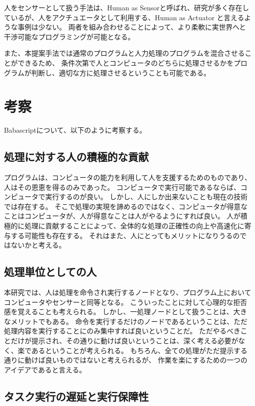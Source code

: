 \documentclass[twoside]{wiss}
\begin{document}
人をセンサーとして扱う手法は、Human as Sensorと呼ばれ、研究が多く存在しているが、人をアクチュエータとして利用する、Human as Actuator と言えるような事例は少ない。
両者を組み合わせることによって、より柔軟に実世界へと干渉可能なプログラミングが可能となる。

また、本提案手法では通常のプログラムと人力処理のプログラムを混合させることができるため、
条件次第で人とコンピュータのどちらに処理させるかをプログラムが判断し、適切な方に処理させるということも可能である。


\section{考察}

Babascriptについて、以下のように考察する。

\subsection{処理に対する人の積極的な貢献}

プログラムは、コンピュータの能力を利用して人を支援するためのものであり、人はその恩恵を得るのみであった。
コンピュータで実行可能であるならば、コンピュータで実行するのが良い。
しかし、人にしか出来ないことも現在の技術では存在する。
そこで処理の実現を諦めるのではなく、コンピュータが得意なことはコンピュータが、人が得意なことは人がやるようにすれば良い。
人が積極的に処理に貢献することによって、全体的な処理の正確性の向上や高速化に寄与する可能性も存在する。
それはまた、人にとってもメリットになりうるのではないかと考える。

\subsection{処理単位としての人}

本研究では、人は処理を命令され実行するノードとなり、プログラム上においてコンピュータやセンサーと同等となる。
こういったことに対して心理的な拒否感を覚えることも考えられる。
しかし、一処理ノードとして扱うことは、大きなメリットでもある。
命令を実行するだけのノードであるということは、ただ処理内容を実行することにのみ集中すれば良いということだ。
ただやるべきことだけが提示され、その通りに動けば良いということは、深く考える必要がなく、楽であるということが考えられる。
もちろん、全ての処理がただ提示する通りに動けば良いものではないと考えられるが、
作業を楽にするための一つのアイデアであると言える。

\subsection{タスク実行の遅延と実行保障性}
\end{document}
